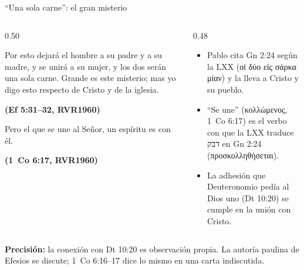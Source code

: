 \documentclass[hyperref={bookmarks=false},aspectratio=169]{beamer}
\newcommand{\heb}[1]{\mbox{\foreignlanguage{hebrew}{#1}}}
\newcommand{\grc}[1]{\foreignlanguage{ancientgreek}{#1}}
\newcommand{\fuente}[1]{\par\hfill{\upshape\bfseries\footnotesize\textcolor{azul}{#1}}}
\newcommand{\precision}[1]{{\footnotesize\color{gris}\textbf{Precisión:} #1}}
\begin{document}
\begin{frame}{``Una sola carne'': el gran misterio}
\begin{columns}[t,onlytextwidth]
\begin{column}{0.50\textwidth}
\begin{cita}[fontupper=\scriptsize\itshape]Por esto dejará el hombre a su padre y a su madre, y se unirá a su mujer, y los dos serán una sola carne. Grande es este misterio; mas yo digo esto respecto de Cristo y de la iglesia.\fuente{(Ef 5:31--32, RVR1960)}\end{cita}
\begin{cita}[fontupper=\scriptsize\itshape]Pero el que se une al Señor, un espíritu es con él.\fuente{(1~Co 6:17, RVR1960)}\end{cita}
\end{column}
\begin{column}{0.48\textwidth}\small
\begin{itemize}
\item Pablo cita Gn 2:24 según la LXX (\grc{οἱ δύο εἰς σάρκα μίαν}) y la lleva a Cristo y su pueblo.
\item ``Se une'' (\grc{κολλώμενος}, 1~Co 6:17) es el verbo con que la LXX traduce \heb{דבק} en Gn 2:24 (\grc{προσκολληθήσεται}).
\item La adhesión que Deuteronomio pedía al Dios uno (Dt 10:20) se cumple en la unión con Cristo.
\end{itemize}
\end{column}
\end{columns}\par\smallskip
\precision{la conexión con Dt 10:20 es observación propia. La autoría paulina de Efesios se discute; 1~Co 6:16--17 dice lo mismo en una carta indiscutida.}
\end{frame}
\end{document}

